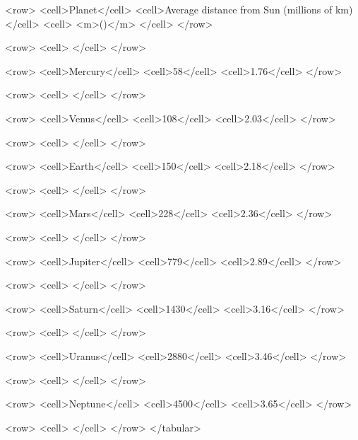             <row>
                <cell>Planet</cell>
                <cell>Average distance from Sun (millions of km)</cell>
                <cell> <m>\log ()</m> </cell>
            </row>

            <row>
                <cell> </cell>
            </row>

            <row>
                <cell>Mercury</cell>
                <cell>58</cell>
                <cell>1.76</cell>
            </row>

            <row>
                <cell> </cell>
            </row>

            <row>
                <cell>Venus</cell>
                <cell>108</cell>
                <cell>2.03</cell>
            </row>

            <row>
                <cell> </cell>
            </row>

            <row>
                <cell>Earth</cell>
                <cell>150</cell>
                <cell>2.18</cell>
            </row>

            <row>
                <cell> </cell>
            </row>

            <row>
                <cell>Mars</cell>
                <cell>228</cell>
                <cell>2.36</cell>
            </row>

            <row>
                <cell> </cell>
            </row>

            <row>
                <cell>Jupiter</cell>
                <cell>779</cell>
                <cell>2.89</cell>
            </row>

            <row>
                <cell> </cell>
            </row>

            <row>
                <cell>Saturn</cell>
                <cell>1430</cell>
                <cell>3.16</cell>
            </row>

            <row>
                <cell> </cell>
            </row>

            <row>
                <cell>Uranus</cell>
                <cell>2880</cell>
                <cell>3.46</cell>
            </row>

            <row>
                <cell> </cell>
            </row>

            <row>
                <cell>Neptune</cell>
                <cell>4500</cell>
                <cell>3.65</cell>
            </row>

            <row>
                <cell> </cell>
            </row>
        </tabular>

